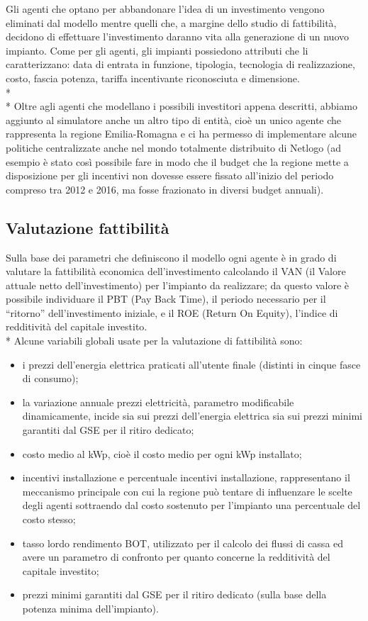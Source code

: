 Gli agenti che optano per abbandonare l'idea di un investimento vengono eliminati dal modello mentre quelli che, a margine dello studio di fattibilità, decidono di effettuare l'investimento daranno vita alla generazione di un nuovo impianto. Come per gli agenti, gli impianti possiedono attributi che li caratterizzano: data di entrata in funzione, tipologia, tecnologia di realizzazione, costo, fascia potenza, tariffa incentivante riconosciuta e dimensione.\\* \\*
Oltre agli agenti che modellano i possibili investitori appena descritti, abbiamo aggiunto al simulatore anche un altro tipo di entità, cioè un unico agente che rappresenta la regione Emilia-Romagna e ci ha permesso di implementare alcune politiche centralizzate anche nel mondo totalmente distribuito di Netlogo (ad esempio è stato così possibile fare in modo che il budget che la regione mette a disposizione per gli incentivi non dovesse essere fissato all'inizio del periodo compreso tra 2012 e 2016, ma fosse frazionato in diversi budget annuali).

\subsection{Valutazione fattibilità}
Sulla base dei parametri che definiscono il modello ogni agente è in grado di valutare la fattibilità economica dell'investimento calcolando il VAN (il Valore attuale netto dell'investimento) per l'impianto da realizzare; da questo valore è possibile individuare il PBT (Pay Back Time), il periodo necessario per il ``ritorno'' dell'investimento iniziale, e il ROE (Return On Equity), l'indice di redditività del capitale investito.
\\*
Alcune variabili globali usate per la valutazione di fattibilità sono:
\begin{itemize}
\item i prezzi dell'energia elettrica praticati all'utente finale (distinti in cinque fasce di consumo);
\item la variazione annuale prezzi elettricità, parametro modificabile dinamicamente, incide sia sui prezzi dell'energia elettrica sia sui prezzi minimi garantiti dal GSE per il ritiro dedicato;
\item costo medio al kWp, cioè il costo medio per ogni kWp installato;
\item incentivi installazione e percentuale incentivi installazione, rappresentano il meccanismo principale con cui la regione può tentare di influenzare le scelte degli agenti sottraendo dal costo sostenuto per l'impianto una percentuale del costo stesso;
\item tasso lordo rendimento BOT, utilizzato per il calcolo dei flussi di cassa ed avere un parametro di confronto per quanto concerne la redditività del capitale investito;
\item prezzi minimi garantiti dal GSE per il ritiro dedicato (sulla base della potenza minima dell'impianto).
\end{itemize}


